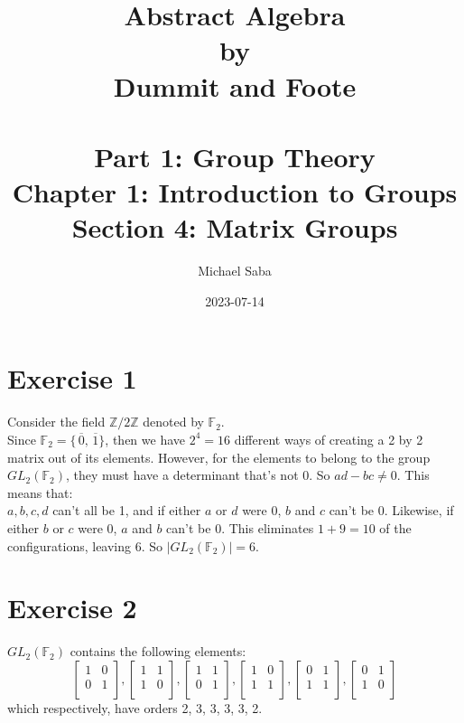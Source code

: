 \documentclass[12pt]{article}
\title{%
    \Huge Abstract Algebra \\
    \large by \\
    \Large Dummit and Foote \\~\\
    \huge Part 1: Group Theory \\
    \LARGE Chapter 1: Introduction to Groups \\
    \Large Section 4: Matrix Groups
}
\date{2023-07-14}
\author{Michael Saba}
\newcommand{\Z}{\mathbb{Z}}
\newcommand{\F}{\mathbb{F}}
\newcommand{\olsi}[1]{\,\overline{\!{#1}}}
\begin{document}
    \maketitle
    \newpage


    \section*{Exercise 1}
    Consider the field $\Z/2\Z$ denoted by $\F_2$. \\
    Since $\F_2 = \{\olsi{0}, \olsi{1}\}$,
    then we have $2^4 = 16$ different ways of creating a 2 by 2 matrix out of its
    elements.
    However, for the elements to belong to the group $GL_2(\F_2)$,
    they must have a determinant that's not 0.
    So $ad - bc \neq 0$. This means that: \\
    $a, b, c, d$ can't all be 1,
    and if either $a$ or $d$ were 0, $b$ and $c$ can't be 0.
    Likewise, if either $b$ or $c$ were 0, $a$ and $b$ can't be 0.
    This eliminates $1 + 9 = 10$ of the configurations, leaving 6.
    So $|GL_2(\F_2)| = 6$.


    \section*{Exercise 2}
    $GL_2(\F_2)$ contains the following elements: \\
    \[ \begin{bmatrix}
        1 & 0 \\
        0 & 1 \\
    \end{bmatrix},
    \begin{bmatrix}
        1 & 1 \\
        1 & 0 \\
    \end{bmatrix},
    \begin{bmatrix}
        1 & 1 \\
        0 & 1 \\
    \end{bmatrix},
    \begin{bmatrix}
        1 & 0 \\
        1 & 1 \\
    \end{bmatrix},
    \begin{bmatrix}
        0 & 1 \\
        1 & 1 \\
    \end{bmatrix},
    \begin{bmatrix}
        0 & 1 \\
        1 & 0 \\
    \end{bmatrix} \]
    which respectively, have orders 2, 3, 3, 3, 3, 2.
\end{document}
